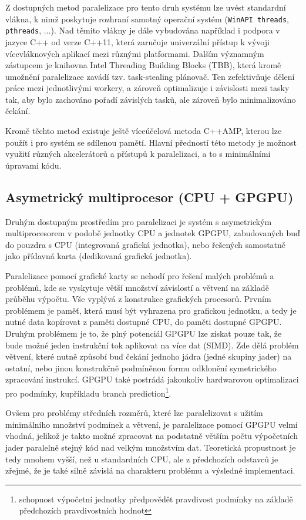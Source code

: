 \documentclass[]{thesiskiv}
\begin{document}
Z dostupných metod paralelizace pro tento druh systému lze uvést standardní vlákna, k nimž poskytuje rozhraní samotný operační systém (\texttt{WinAPI threads}, \texttt{pthreads}, ...). Nad těmito vlákny je dále vybudována například i podpora v jazyce C++ od verze C++11, která zaručuje univerzální přístup k vývoji vícevláknových aplikací mezi různými platformami. Dalším významným zástupcem je knihovna Intel Threading Building Blocks (TBB), která kromě umožnění paralelizace zavádí tzv. task-stealing plánovač. Ten zefektivňuje dělení práce mezi jednotlivými workery, a zároveň optimalizuje i závislosti mezi tasky tak, aby bylo zachováno pořadí závislých tasků, ale zároveň bylo minimalizováno čekání.

Kromě těchto metod existuje ještě víceúčelová metoda C++AMP, kterou lze použít i pro systém se sdílenou pamětí. Hlavní předností této metody je možnost využití různých akcelerátorů a přístupů k paralelizaci, a to s minimálními úpravami kódu.

\subsection{Asymetrický multiprocesor (CPU + GPGPU)}

Druhým dostupným prostředím pro paralelizaci je systém s asymetrickým multiprocesorem v podobě jednotky CPU a jednotek GPGPU, zabudovaných buď do pouzdra s CPU (integrovaná grafická jednotka), nebo řešených samostatně jako přídavná karta (dedikovaná grafická jednotka).

Paralelizace pomocí grafické karty se nehodí pro řešení malých problémů a problémů, kde se vyskytuje větší množství závislostí a větvení na základě průběhu výpočtu. Vše vyplývá z konstrukce grafických procesorů. Prvním problémem je paměť, která musí být vyhrazena pro grafickou jednotku, a tedy je nutné data kopírovat z paměti dostupné CPU, do paměti dostupné GPGPU. Druhým problémem je to, že plný potenciál GPGPU lze získat pouze tak, že bude možné jeden instrukční tok aplikovat na více dat (SIMD). Zde dělá problém větvení, které nutně způsobí buď čekání jednoho jádra (jedné skupiny jader) na ostatní, nebo jinou konstrukčně podmíněnou formu odklonění symetrického zpracování instrukcí. GPGPU také postrádá jakoukoliv hardwarovou optimalizaci pro podmínky, kupříkladu branch prediction\footnote{schopnost výpočetní jednotky předpovědět pravdivost podmínky na základě předchozích pravdivostních hodnot}.

Ovšem pro problémy středních rozměrů, které lze paralelizovat s užitím minimálního množství podmínek a větvení, je paralelizace pomocí GPGPU velmi vhodná, jelikož je takto možné zpracovat na podstatně větším počtu výpočetních jader paralelně stejný kód nad velkým množstvím dat. Teoretická propustnost je tedy mnohem vyšší, než u standardních CPU, ale z předchozích odstavců je zřejmé, že je také silně závislá na charakteru problému a výsledné implementaci.
\end{document}
